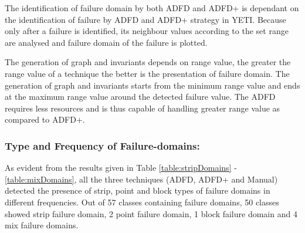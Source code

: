 The identification of failure domain by both ADFD and ADFD+ is dependant on the identification of failure by ADFD and ADFD+ strategy in YETI. Because only after a failure is identified, its neighbour values according to the set range are analysed and failure domain of the failure is plotted.

The generation of graph and invariants depends on range value, the greater the range value of a technique the better is the presentation of failure domain. The generation of graph and invariants starts from the minimum range value and ends at the maximum range value around the detected failure value. The ADFD requires less resources and is thus capable of handling  greater range value as compared to ADFD+.  








\subsubsection{Type and Frequency of Failure-domains:}
As evident from the results given in Table \ref{table:stripDomains} - \ref{table:mixDomains}, all the three techniques (ADFD, ADFD+ and Manual) detected the presence of strip, point and block types of failure domains in different frequencies. Out of 57 classes containing failure domains, 50 classes showed strip failure domain, 2 point failure domain, 1 block failure domain and 4 mix failure domains.  

